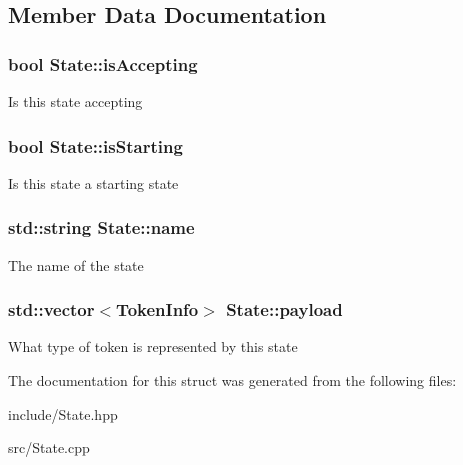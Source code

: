 \subsection{Member Data Documentation}
\subsubsection[{\texorpdfstring{is\+Accepting}{isAccepting}}]{\setlength{\rightskip}{0pt plus 5cm}bool State\+::is\+Accepting}\hypertarget{structState_ab48af65a07f9ae4dfb880bacfbd2e812}{}\label{structState_ab48af65a07f9ae4dfb880bacfbd2e812}
Is this state accepting 
\subsubsection[{\texorpdfstring{is\+Starting}{isStarting}}]{\setlength{\rightskip}{0pt plus 5cm}bool State\+::is\+Starting}\hypertarget{structState_a578fb1731639aab7ee201241ac00b728}{}\label{structState_a578fb1731639aab7ee201241ac00b728}
Is this state a starting state 
\subsubsection[{\texorpdfstring{name}{name}}]{\setlength{\rightskip}{0pt plus 5cm}std\+::string State\+::name}\hypertarget{structState_ad57f19fd0a86f129840d8739253d2c72}{}\label{structState_ad57f19fd0a86f129840d8739253d2c72}
The name of the state 
\subsubsection[{\texorpdfstring{payload}{payload}}]{\setlength{\rightskip}{0pt plus 5cm}std\+::vector$<${\bf Token\+Info}$>$ State\+::payload}\hypertarget{structState_a19ea4225f19a3281e2d6c890b0c09312}{}\label{structState_a19ea4225f19a3281e2d6c890b0c09312}
What type of token is represented by this state 

The documentation for this struct was generated from the following files\+:\begin{DoxyCompactItemize}
\item 
include/State.\+hpp\item 
src/State.\+cpp\end{DoxyCompactItemize}
